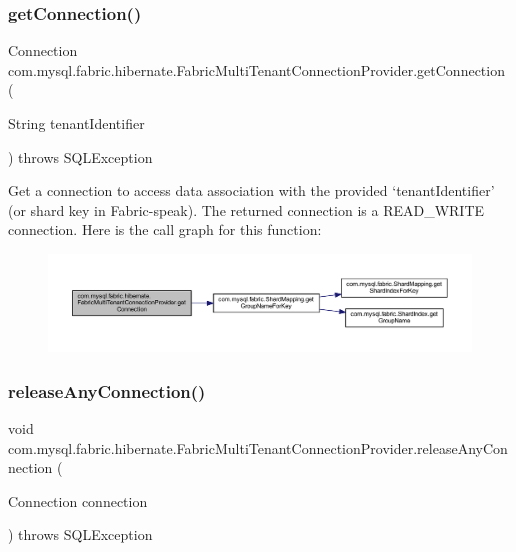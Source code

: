 \subsubsection{\texorpdfstring{get\+Connection()}{getConnection()}}
{\footnotesize\ttfamily Connection com.\+mysql.\+fabric.\+hibernate.\+Fabric\+Multi\+Tenant\+Connection\+Provider.\+get\+Connection (\begin{DoxyParamCaption}\item[{String}]{tenant\+Identifier }\end{DoxyParamCaption}) throws S\+Q\+L\+Exception}

Get a connection to access data association with the provided `tenant\+Identifier' (or shard key in Fabric-\/speak). The returned connection is a R\+E\+A\+D\+\_\+\+W\+R\+I\+TE connection. Here is the call graph for this function\+:\nopagebreak
\begin{figure}[H]
\begin{center}
\leavevmode
\includegraphics[width=350pt]{classcom_1_1mysql_1_1fabric_1_1hibernate_1_1_fabric_multi_tenant_connection_provider_a5e2f7fa211f847bce86d4c89b1665ff6_cgraph}
\end{center}
\end{figure}
\mbox{\label{classcom_1_1mysql_1_1fabric_1_1hibernate_1_1_fabric_multi_tenant_connection_provider_a40292c72bd0ebf6f73e17f57fcc2ca38}} 
\subsubsection{\texorpdfstring{release\+Any\+Connection()}{releaseAnyConnection()}}
{\footnotesize\ttfamily void com.\+mysql.\+fabric.\+hibernate.\+Fabric\+Multi\+Tenant\+Connection\+Provider.\+release\+Any\+Connection (\begin{DoxyParamCaption}\item[{Connection}]{connection }\end{DoxyParamCaption}) throws S\+Q\+L\+Exception}

